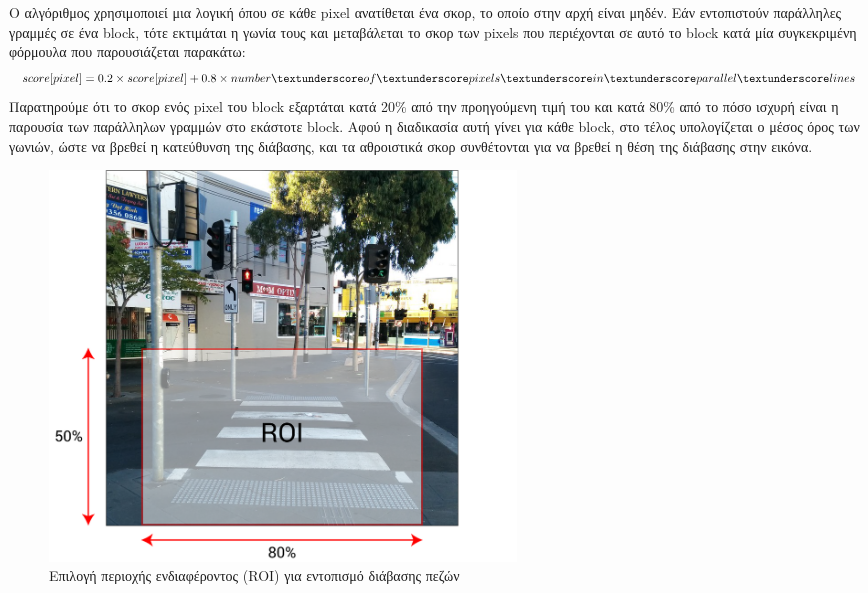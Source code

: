 Ο αλγόριθμος χρησιμοποιεί μια λογική όπου σε κάθε pixel ανατίθεται ένα σκορ, το οποίο στην αρχή είναι μηδέν. Εάν εντοπιστούν παράλληλες γραμμές σε ένα block, τότε εκτιμάται η γωνία τους και μεταβάλεται το σκορ των pixels που περιέχονται σε αυτό το block κατά μία συγκεκριμένη φόρμουλα που παρουσιάζεται παρακάτω:$$score[pixel] = 0.2\times score[pixel] + 0.8\times number\textunderscore of\textunderscore pixels\textunderscore in\textunderscore parallel\textunderscore lines$$ Παρατηρούμε ότι το σκορ ενός pixel του block εξαρτάται κατά 20\% από την προηγούμενη τιμή του και κατά 80\% από το πόσο ισχυρή είναι η παρουσία των παράλληλων γραμμών στο εκάστοτε block. Αφού η διαδικασία αυτή γίνει για κάθε block, στο τέλος υπολογίζεται ο μέσος όρος των γωνιών, ώστε να βρεθεί η κατεύθυνση της διάβασης, και τα αθροιστικά σκορ συνθέτονται για να βρεθεί η θέση της διάβασης στην εικόνα.

\begin{figure}[H]
    \centering
    \includegraphics[width=0.6\textwidth]{images/lower_roi.png}
    \caption{Επιλογή περιοχής ενδιαφέροντος (ROI) για εντοπισμό διάβασης πεζών}
    \label{fig:lower-roi}
\end{figure}

